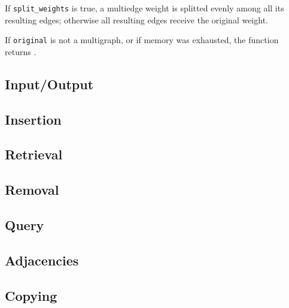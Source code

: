   If \lstinline!split_weights! is true, a multiedge weight is splitted evenly among all its resulting edges; otherwise all resulting edges receive the original 
  weight.
  
  If \lstinline!original! is not a multigraph, or if memory was exhausted, the function returns \NULL.

\subsection{Input/Output}
\label{sec:graph-io}

\subsection{Insertion}
\label{sec:graph-insertion}

\subsection{Retrieval}
\label{sec:graph-retrieval}

\subsection{Removal}
\label{sec:graph-removal}

\subsection{Query}
\label{sec:graph-query}

\subsection{Adjacencies}
\label{sec:graph-adjacencies}

\subsection{Copying}
\label{sec:graph-copying}
